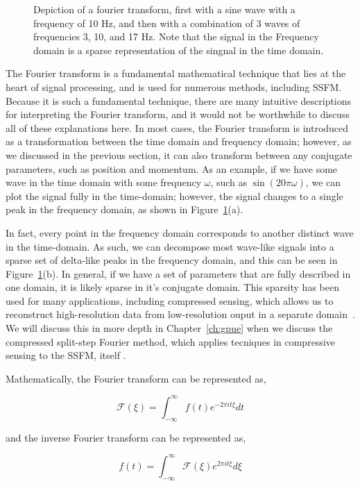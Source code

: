 \begin{figure}
\begin{centering}
\end{centering}

\caption{Depiction of a fourier transform, first with a sine wave with a frequency of 10 Hz, and then with a combination of 3 waves of frequencies 3, 10, and 17 Hz. Note that the signal in the Frequency domain is a sparse representation of the singnal in the time domain.}
\label{fig:FT}
\end{figure}

The Fourier transform is a fundamental mathematical technique that lies at the heart of signal processing, and is used for numerous methods, including SSFM.
Because it is such a fundamental technique, there are many intuitive descriptions for interpreting the Fourier transform, and it would not be worthwhile to discuss all of these explanations here.
In most cases, the Fourier transform is introduced as a transformation between the time domain and frequency domain; however, as we discussed in the previous section, it can also transform between any conjugate parameters, such as position and momentum.
As an example, if we have some wave in the time domain with some frequency $\omega$, such as $\sin(20\pi\omega)$, we can plot the signal fully in the time-domain; however, the signal changes to a single peak in the frequency domain, as shown in Figure~\ref{fig:FT}(a).

In fact, every point in the frequency domain corresponds to another distinct wave in the time-domain.
As such, we can decompose most wave-like signals into a sparse set of delta-like peaks in the frequency domain, and this can be seen in Figure~\ref{fig:FT}(b).
In general, if we have a set of parameters that are fully described in one domain, it is likely sparse in it's conjugate domain.
This sparsity has been used for many applications, including compressed sensing, which allows us to reconstruct high-resolution data from low-resolution ouput in a separate domain~\cite{baraniuk2011}.
We will discuss this in more depth in Chapter~\ref{ch:gpue} when we discuss the compressed split-step Fourier method, which applies tecniques in compressive sensing to the SSFM, itself \cite{bayindir2015}.

Mathematically, the Fourier transform can be represented as,

$$
\mathcal{F}(\xi) = \int_{-\infty}^{\infty}f(t)e^{-2\pi i t \xi}dt
$$

\noindent and the inverse Fourier transform can be represented as,

$$
f(t) = \int_{-\infty}^{\infty}\mathcal{F}(\xi)e^{2\pi i t \xi}d\xi
$$

